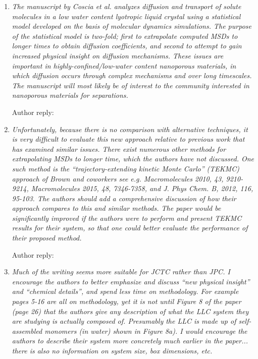 \documentclass{article}
\begin{document}
\begin{enumerate}[label={Comment \theenumi :}, leftmargin=3.9\parindent]

    \item \textit{The manuscript by Coscia et al. analyzes diffusion and transport of solute molecules
    in a low water content lyotropic liquid crystal using a statistical model developed on the basis 
    of molecular dynamics simulations. The purpose of the statistical model is two-fold; first to 
    extrapolate computed MSDs to longer times to obtain diffusion coefficients, and second to attempt
    to gain increased physical insight on diffusion mechanisms. These issues are important in 
    highly-confined/low-water content nanoporous materials, in which diffusion occurs through complex
    mechanisms and over long timescales. The manuscript will most likely be of interest to the community
    interested in nanoporous materials for separations.}
    
    Author reply:
    
    \item \textit {Unfortunately, because there is no comparison with alternative techniques, it is 
    very difficult to evaluate this new approach relative to previous work that has examined similar 
    issues. There exist numerous other methods for extrapolating MSDs to longer time, which the 
    authors have not discussed. One such method is the “trajectory-extending kinetic Monte Carlo” 
    (TEKMC) approach of Brown and coworkers see e.g. Macromolecules 2010, 43, 9210-9214, 
    Macromolecules 2015, 48, 7346-7358, and J. Phys Chem. B, 2012, 116, 95-103. The authors should 
    add a comprehensive discussion of how their approach compares to this and similar methods. The 
    paper would be significantly improved if the authors were to perform and present TEKMC results 
    for their system, so that one could better evaluate the performance of their proposed method.}
    
    Author reply:
    
    \item \textit{Much of the writing seems more suitable for JCTC rather than JPC. I encourage the
    authors to better emphasize and discuss “new physical insight” and “chemical details”, and spend
    less time on methodology. For example pages 5-16 are all on methodology, yet it is not until 
    Figure 8 of the paper (page 26) that the authors give any description of what the LLC system 
    they are studying is actually composed of. Presumably the LLC is made up of self-assembled 
    monomers (in water) shown in Figure 8a). I would encourage the authors to describe their 
    system more concretely much earlier in the paper... there is also no information on system 
    size, box dimensions, etc.}
    

\end{enumerate}
\end{document}
